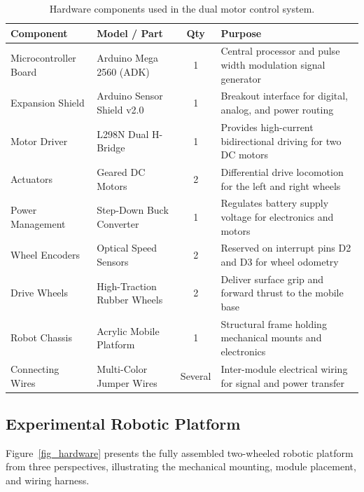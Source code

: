 \documentclass[11pt,a4paper]{article}
\begin{document}
\begin{table}[H]
\centering
\begin{tabularx}{\textwidth}{@{}llcX@{}}
\toprule
\textbf{Component} & \textbf{Model / Part} & \textbf{Qty} & \textbf{Purpose} \\
\midrule
Microcontroller Board & Arduino Mega 2560 (ADK) & 1 & Central processor and pulse width modulation signal generator \\
Expansion Shield & Arduino Sensor Shield v2.0 & 1 & Breakout interface for digital, analog, and power routing \\
Motor Driver & L298N Dual H-Bridge & 1 & Provides high-current bidirectional driving for two DC motors \\
Actuators & Geared DC Motors & 2 & Differential drive locomotion for the left and right wheels \\
Power Management & Step-Down Buck Converter & 1 & Regulates battery supply voltage for electronics and motors \\
Wheel Encoders & Optical Speed Sensors & 2 & Reserved on interrupt pins D2 and D3 for wheel odometry \\
Drive Wheels & High-Traction Rubber Wheels & 2 & Deliver surface grip and forward thrust to the mobile base \\
Robot Chassis & Acrylic Mobile Platform & 1 & Structural frame holding mechanical mounts and electronics \\
Connecting Wires & Multi-Color Jumper Wires & Several & Inter-module electrical wiring for signal and power transfer \\
\bottomrule
\end{tabularx}
\caption{Hardware components used in the dual motor control system.}
\label{tab_components}
\end{table}

\subsection{Experimental Robotic Platform}
Figure~\ref{fig_hardware} presents the fully assembled two-wheeled robotic platform from three perspectives, illustrating the mechanical mounting, module placement, and wiring harness.
\end{document}

